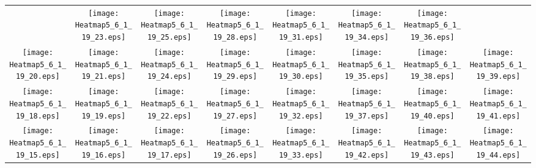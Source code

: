 \documentclass{standalone}
\begin{document}
\renewcommand{\arraystretch}{0}
\setlength{\tabcolsep}{0pt}
\begin{tabular}{ *8{c} }
 & \texttt{[image: Heatmap5\_6\_1\_19\_23.eps]} & \texttt{[image: Heatmap5\_6\_1\_19\_25.eps]} & \texttt{[image: Heatmap5\_6\_1\_19\_28.eps]} & \texttt{[image: Heatmap5\_6\_1\_19\_31.eps]} & \texttt{[image: Heatmap5\_6\_1\_19\_34.eps]} & \texttt{[image: Heatmap5\_6\_1\_19\_36.eps]} &  \\
\texttt{[image: Heatmap5\_6\_1\_19\_20.eps]} & \texttt{[image: Heatmap5\_6\_1\_19\_21.eps]} & \texttt{[image: Heatmap5\_6\_1\_19\_24.eps]} & \texttt{[image: Heatmap5\_6\_1\_19\_29.eps]} & \texttt{[image: Heatmap5\_6\_1\_19\_30.eps]} & \texttt{[image: Heatmap5\_6\_1\_19\_35.eps]} & \texttt{[image: Heatmap5\_6\_1\_19\_38.eps]} & \texttt{[image: Heatmap5\_6\_1\_19\_39.eps]} \\
\texttt{[image: Heatmap5\_6\_1\_19\_18.eps]} & \texttt{[image: Heatmap5\_6\_1\_19\_19.eps]} & \texttt{[image: Heatmap5\_6\_1\_19\_22.eps]} & \texttt{[image: Heatmap5\_6\_1\_19\_27.eps]} & \texttt{[image: Heatmap5\_6\_1\_19\_32.eps]} & \texttt{[image: Heatmap5\_6\_1\_19\_37.eps]} & \texttt{[image: Heatmap5\_6\_1\_19\_40.eps]} & \texttt{[image: Heatmap5\_6\_1\_19\_41.eps]} \\
\texttt{[image: Heatmap5\_6\_1\_19\_15.eps]} & \texttt{[image: Heatmap5\_6\_1\_19\_16.eps]} & \texttt{[image: Heatmap5\_6\_1\_19\_17.eps]} & \texttt{[image: Heatmap5\_6\_1\_19\_26.eps]} & \texttt{[image: Heatmap5\_6\_1\_19\_33.eps]} & \texttt{[image: Heatmap5\_6\_1\_19\_42.eps]} & \texttt{[image: Heatmap5\_6\_1\_19\_43.eps]} & \texttt{[image: Heatmap5\_6\_1\_19\_44.eps]} \\

\end{tabular}
\end{document}

